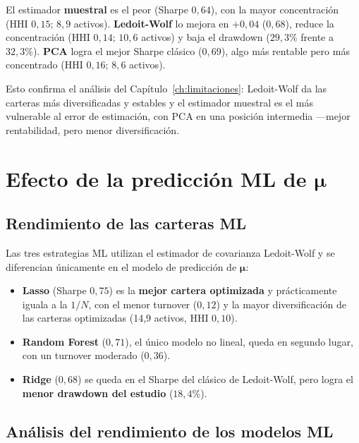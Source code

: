 El estimador \textbf{muestral} es el peor (Sharpe $0{,}64$), con la mayor
concentración (HHI $0{,}15$; $8{,}9$ activos). \textbf{Ledoit-Wolf} lo mejora en
$+0{,}04$ ($0{,}68$), reduce la concentración (HHI $0{,}14$; $10{,}6$ activos) y
baja el drawdown ($29{,}3\%$ frente a $32{,}3\%$). \textbf{PCA} logra el mejor
Sharpe clásico ($0{,}69$), algo más rentable pero más concentrado (HHI $0{,}16$;
$8{,}6$ activos).

Esto confirma el análisis del Capítulo~\ref{ch:limitaciones}: Ledoit-Wolf da
las carteras más diversificadas y estables y el estimador muestral es el más
vulnerable al error de estimación, con PCA en una posición intermedia ---mejor
rentabilidad, pero menor diversificación.

\section{Efecto de la predicción ML de \texorpdfstring{$\boldsymbol{\mu}$}{μ}}

\subsection{Rendimiento de las carteras ML}

Las tres estrategias ML utilizan el estimador de covarianza Ledoit-Wolf y
se diferencian únicamente en el modelo de predicción de $\boldsymbol{\mu}$:

\begin{itemize}
    \item \textbf{Lasso} (Sharpe $0{,}75$) es la \textbf{mejor cartera
          optimizada} y prácticamente iguala a la $1/N$, con el menor turnover
          ($0{,}12$) y la mayor diversificación de las carteras optimizadas
          (14,9 activos, HHI $0{,}10$).
    \item \textbf{Random Forest} ($0{,}71$), el único modelo no lineal, queda
          en segundo lugar, con un turnover moderado ($0{,}36$).
    \item \textbf{Ridge} ($0{,}68$) se queda en el Sharpe del clásico de
          Ledoit-Wolf, pero logra el \textbf{menor drawdown del estudio}
          ($18{,}4\%$).
\end{itemize}

\subsection{Análisis del rendimiento de los modelos ML}

